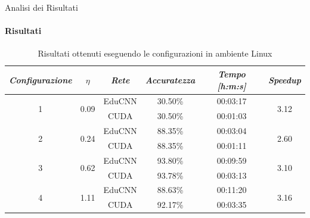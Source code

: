 \documentclass[
 ]{beamer}
\begin{document}
\begin{frame}{Analisi dei Risultati}
    \framesubtitle{Risultati}

        \begin{table}
            \centering
            \renewcommand\arraystretch{1.3}
            \small
            \begin{tabular}{| c | c | c | c | c | c |}
                \hline
                \emph{Configurazione} & $\eta$ & \emph{Rete} & \emph{Accuratezza} & \emph{Tempo [h:m:s]} & \emph{Speedup} \\
                \hline
                \multirow{2}{*}{1} & \multirow{2}{*}{0.09} & EduCNN & 30.50\% & 00:03:17 & \multirow{2}{*}{3.12} \\ \cline{3-5} 
                                   &                       & CUDA   & 30.50\% & 00:01:03 & \\
                \hline
                \multirow{2}{*}{2} & \multirow{2}{*}{0.24} & EduCNN & 88.35\% & 00:03:04 & \multirow{2}{*}{2.60} \\ \cline{3-5} 
                                   &                       & CUDA   & 88.35\% & 00:01:11 & \\
                \hline
                \multirow{2}{*}{3} & \multirow{2}{*}{0.62} & EduCNN & 93.80\% & 00:09:59 & \multirow{2}{*}{3.10} \\ \cline{3-5} 
                                   &                       & CUDA   & 93.78\% & 00:03:13 & \\
                \hline
                \multirow{2}{*}{4} & \multirow{2}{*}{1.11} & EduCNN & 88.63\% & 00:11:20 & \multirow{2}{*}{3.16} \\ \cline{3-5} 
                                   &                       & CUDA   & 92.17\% & 00:03:35 & \\
                \hline
            \end{tabular}
            \caption{Risultati ottenuti eseguendo le configurazioni in ambiente Linux}          
        \end{table}    
\end{frame}
\end{document}
